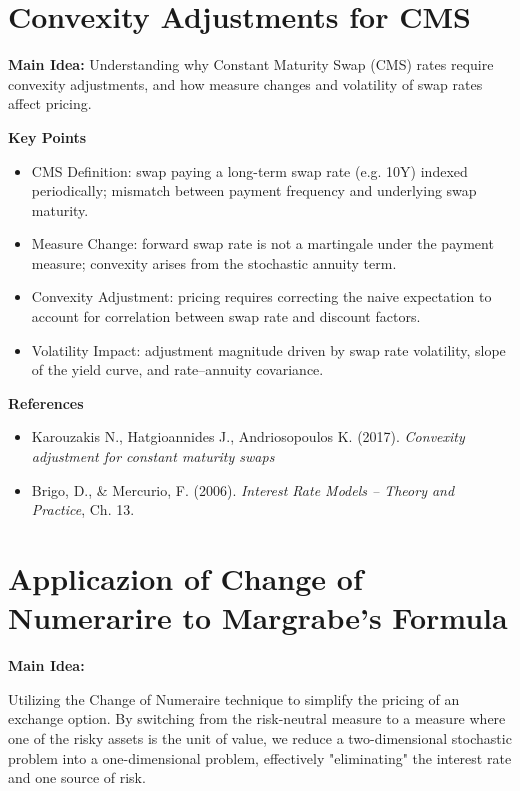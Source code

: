 \documentclass[12pt,a4paper]{article}
\begin{document}
\section{Convexity Adjustments for CMS}

\textbf{Main Idea:}  
Understanding why Constant Maturity Swap (CMS) rates require convexity adjustments, and how measure changes and volatility of swap rates affect pricing.

\medskip
\textbf{Key Points}
\begin{itemize}
    \item CMS Definition: swap paying a long-term swap rate (e.g. 10Y) indexed periodically; mismatch between payment frequency and underlying swap maturity.
    
    \item Measure Change: forward swap rate is not a martingale under the payment measure; convexity arises from the stochastic annuity term.
    
    \item Convexity Adjustment: pricing requires correcting the naive expectation to account for correlation between swap rate and discount factors.
    
    \item Volatility Impact: adjustment magnitude driven by swap rate volatility, slope of the yield curve, and rate–annuity covariance.
\end{itemize}

\medskip
\textbf{References}
\begin{itemize}
    \item[-] Karouzakis N., Hatgioannides J., Andriosopoulos K. (2017). \textit{Convexity adjustment for constant maturity swaps}
    \item[-] Brigo, D., \& Mercurio, F. (2006). \textit{Interest Rate Models – Theory and Practice}, Ch. 13.
   
\end{itemize}

\section{Applicazion of Change of Numerarire to Margrabe's Formula}

\textbf{Main Idea:}

Utilizing the Change of Numeraire technique to simplify the pricing of an exchange option. By switching from the risk-neutral measure to a measure where one of the risky assets is the unit of value, we reduce a two-dimensional stochastic problem into a one-dimensional problem, effectively "eliminating" the interest rate and one source of risk.
\end{document}
